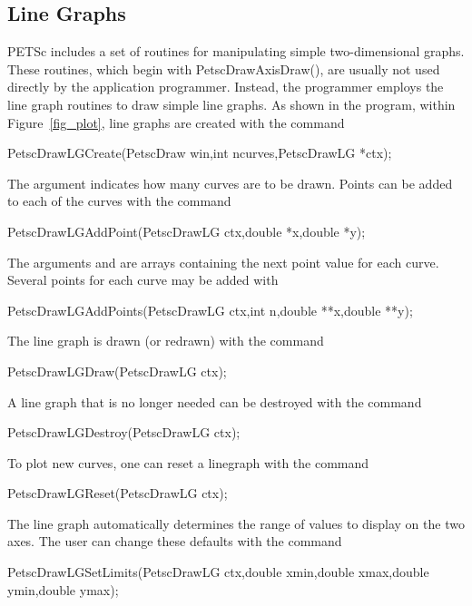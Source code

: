 {{{\subsection{Line Graphs}
PETSc includes a set of routines for manipulating simple two-dimensional
graphs. These routines, which begin with PetscDrawAxisDraw(), are usually 
not used directly by the application programmer.  Instead, the programmer 
employs the line graph routines to draw simple line graphs.
As shown in the program, within Figure~\ref{fig_plot}, line graphs 
are created with the command  
\begin{tabbing}
  PetscDrawLGCreate(PetscDraw win,int ncurves,PetscDrawLG *ctx);
\end{tabbing}
The argument  indicates how many curves are to be drawn.
Points can be added to each of the curves with the 
command 
\begin{tabbing}
  PetscDrawLGAddPoint(PetscDrawLG ctx,double *x,double *y);
\end{tabbing}
The arguments  and  are arrays containing the next 
point value for each curve.
Several points for each curve may be added with 
\begin{tabbing}
  PetscDrawLGAddPoints(PetscDrawLG ctx,int n,double **x,double **y);
\end{tabbing}

The line graph is drawn (or redrawn) with the command 
\begin{tabbing}
  PetscDrawLGDraw(PetscDrawLG ctx);
\end{tabbing}
A line graph that is no longer needed can be destroyed with the 
command 
\begin{tabbing}
  PetscDrawLGDestroy(PetscDrawLG ctx);
\end{tabbing}
To plot new curves, one can reset a linegraph with the
command 
\begin{tabbing}
  PetscDrawLGReset(PetscDrawLG ctx);
\end{tabbing}
The line graph automatically determines the range of values to 
display on the two axes.  The user can change these defaults with the 
command 
\begin{tabbing}
  PetscDrawLGSetLimits(PetscDrawLG ctx,double xmin,double xmax,double ymin,double ymax);
\end{tabbing}

}}}
